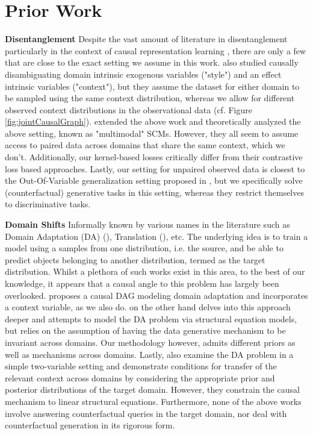 \section{Prior Work}
\label{subsec:priorwork}
\textbf{Disentanglement} Despite the vast amount of literature in disentanglement particularly in the context of causal representation learning \cite{}, there are only a few that are close to the exact setting we assume in this work. \cite{10.5555/3540261.3541519} also studied causally disambiguating domain intrinsic exogenous variables ("style") and an effect intrinsic variables ("context"), but they assume the dataset for either domain to be sampled using the same context distribution, whereas we allow for different observed context distributions in the observational data (cf. Figure \ref{fig:jointCausalGraph}). \cite{pmlr-v206-morioka23a, daunhawer2023identifiability} extended the above work and theoretically analyzed the above setting, known as "multimodal" SCMs. However, they all seem to assume access to paired data across domains that share the same context, which we don't. Additionally, our kernel-based losses critically differ from their contrastive loss based approaches. Lastly, our setting for unpaired observed data is closest to the Out-Of-Variable generalization setting proposed in \cite{guo2024outofvariable}, but we specifically solve (counterfactual) generative tasks in this setting, whereas they restrict themselves to discriminative tasks.

\textbf{Domain Shifts} Informally known by various names in the literature such as Domain Adaptation (DA) (\cite{10.1007/978-3-030-71704-9_65, article}), Translation (\cite{8100115,9010872}), etc. The underlying idea is to train a model using a samples from one distribution, i.e. the source, and be able to predict objects belonging to another distribution, termed as the target distribution. Whilst a plethora of such works exist in this area, to the best of our knowledge, it appears that a causal angle to this problem has largely been overlooked. \cite{NEURIPS2018_39e98420} proposes a causal DAG modeling domain adaptation and incorporates a context variable, as we also do. \cite{10.5555/3524938.3525815} on the other hand delves into this approach deeper and attempts to model the DA problem via structural equation models, but relies on the assumption of having the data generative mechanism to be invariant across domains. Our methodology however, admits different priors as well as mechanisms across domains. 
Lastly, \cite{Zhang_Gong_Schoelkopf_2015} also examine the DA problem in a simple two-variable setting and demonstrate conditions for transfer of the relevant context across domains by considering the appropriate prior and posterior distributions of the target domain. However, they constrain the causal mechanism to linear structural equations. Furthermore, none of the above works involve answering counterfactual queries in the target domain, nor deal with counterfactual generation in its rigorous form.